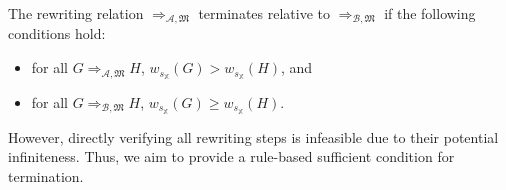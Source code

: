 The rewriting relation \( \mathop{\Rightarrow}_{\mathcal{A},\mathfrak{M}} \) terminates relative to $\mathop{\Rightarrow}_{\mathcal{B},\mathfrak{M}}$ if the following conditions hold:
\begin{itemize}
    \item for all \(G \mathop{\Rightarrow}_{\mathcal{A},\mathfrak{M}} H\), \( w_{s_\mathbb{X}}(G) \mathop{>} w_{s_\mathbb{X}}(H) \), and
    \item for all \(G \mathop{\Rightarrow}_{\mathcal{B},\mathfrak{M}} H\), \( w_{s_\mathbb{X}}(G) \mathop{\geq} w_{s_\mathbb{X}}(H) \).
\end{itemize}   
However, directly verifying all rewriting steps is infeasible due to their potential infiniteness. 
Thus, we aim to provide a rule-based sufficient condition for termination.
